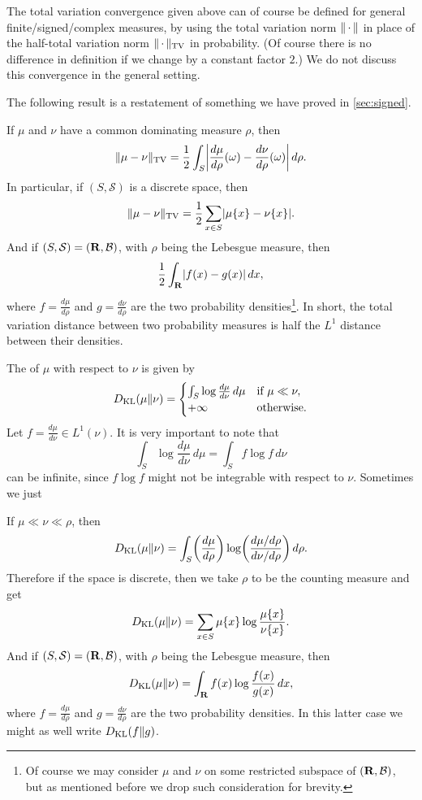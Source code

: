 The total variation convergence given above can of course be defined for general finite/signed/complex measures, by using the total variation norm $\lVert \,\cdot\, \rVert$ in place of the half-total variation norm $\lVert \,\cdot\, \rVert_{\mathrm{TV}}$ in probability. (Of course there is no difference in definition if we change by a constant factor $2$.) We do not discuss this convergence in the general setting.

The following result is a restatement of something we have proved in \cref{sec:signed}.
\begin{fact}
    If $\mu$ and $\nu$ have a common dominating measure $\rho$, then \[
        \lVert \mu - \nu \rVert_{\mathrm{TV}} = \frac{1}{2} \int_{S} \biggl\vert\frac{d\mu}{d\rho}(\omega) - \frac{d\nu}{d\rho}(\omega)\biggr\vert\,d\rho.
    \]
    In particular, if $(S,\mathcal S)$ is a discrete space, then \[\lVert \mu - \nu \rVert_{\mathrm{TV}} = \frac{1}{2}\sum_{x \in S} \lvert \mu\{x\} - \nu\{x\} \rvert.\] And if $(S,\mathcal S) = (\mathbf{R},\mathcal{B})$, with $\rho$ being the Lebesgue measure, then \[\frac{1}{2}\int_{\mathbf{R}} \lvert f(x) - g(x) \rvert \,dx,\] where $f = \frac{d\mu}{d\rho}$ and $g = \frac{d\nu}{d\rho}$ are the two probability densities\footnote{Of course we may consider $\mu$ and $\nu$ on some restricted subspace of $(\mathbf{R},\mathcal{B})$, but as mentioned before we drop such consideration for brevity.}. In short, the total variation distance between two probability measures is half the $L^1$ distance between their densities.
\end{fact}
    

The  of $\mu$ with respect to $\nu$ is given by \[
    D_{\mathrm{KL}}(\mu\Vert \nu) = \begin{cases}
        \int_{S} \log\frac{d\mu}{d\nu}\,d\mu & \text{if } \mu \ll \nu,\\
        +\infty & \text{otherwise}.
    \end{cases}
\]
Let $f = \frac{d\mu}{d\nu} \in L^1(\nu)$. It is very important to note that \[\int_S \log\frac{d\mu}{d\nu} \,d\mu = \int_S f\log f\,d\nu\] can be infinite, since $f \log f$ might not be integrable with respect to $\nu$. Sometimes we just 

\begin{fact} \label{fact:KL-practice}
    If $\mu \ll \nu\ll \rho$, then \[
        D_{\mathrm{KL}}(\mu\Vert \nu) = \int_{S} \biggl(\frac{d\mu}{d\rho}\biggr) \log\biggl(\frac{d\mu/d\rho}{d\nu/d\rho}\biggr) \,d\rho.
    \]
    Therefore if the space is discrete, then we take $\rho$ to be the counting measure and get \[
        D_{\mathrm{KL}}(\mu\Vert \nu) = \sum_{x\in S} \mu\{x\} \log\frac{\mu\{x\}}{\nu\{x\}}.
    \]
    And if $(S,\mathcal S) = (\mathbf{R},\mathcal{B})$, with $\rho$ being the Lebesgue measure, then \[
        D_{\mathrm{KL}}(\mu\Vert \nu) = \int_{\mathbf{R}} f(x) \log\frac{f(x)}{g(x)}\,dx,
    \] where $f = \frac{d\mu}{d\rho}$ and $g = \frac{d\nu}{d\rho}$ are the two probability densities. In this latter case we might as well write $D_{\mathrm{KL}}(f\Vert g)$.
\end{fact}

